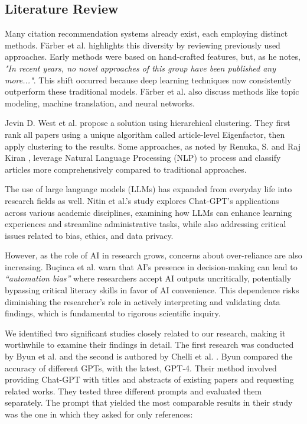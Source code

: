 \documentclass[runningheads]{llncs}
\begin{document}

\subsection{Literature Review}\label{literature}

Many citation recommendation systems already exist, each employing distinct methods. Färber et al. \cite{farber_2020} highlights this diversity by reviewing previously used approaches. Early methods were based on hand-crafted features, but, as he notes, \textit{"In recent years, no novel approaches of this group have been published any more..."}. This shift occurred because deep learning techniques now consistently outperform these traditional models. Färber et al. also discuss methods like topic modeling, machine translation, and neural networks.

Jevin D. West et al. \cite{jevin_2016} propose a solution using hierarchical clustering. They first rank all papers using a unique algorithm called article-level Eigenfactor, then apply clustering to the results. Some approaches, as noted by Renuka, S. and Raj Kiran \cite{Renuka_2021}, leverage Natural Language Processing (NLP) to process and classify articles more comprehensively compared to traditional approaches.

The use of large language models (LLMs) has expanded from everyday life into research fields as well. Nitin et al.'s study \cite{Rane_2023} explores Chat-GPT's applications across various academic disciplines, examining how LLMs can enhance learning experiences and streamline administrative tasks, while also addressing critical issues related to bias, ethics, and data privacy.

However, as the role of AI in research grows, concerns about over-reliance are also increasing. Buçinca et al. \cite{buccinca_2021} warn that AI's presence in decision-making can lead to \textit{“automation bias”} where researchers accept AI outputs uncritically, potentially bypassing critical literacy skills in favor of AI convenience. This dependence risks diminishing the researcher's role in actively interpreting and validating data findings, which is fundamental to rigorous scientific inquiry. 

We identified two significant studies closely related to our research, making it worthwhile to examine their findings in detail. The first research was conducted by Byun et al. \cite{byun-etal-2024-reference} and the second is authored by Chelli et al. \cite{Chelli_2024}. Byun compared the accuracy of different GPTs, with the latest, GPT-4. Their method involved providing Chat-GPT with titles and abstracts of existing papers and requesting related works. They tested three different prompts and evaluated them separately. The prompt that yielded the most comparable results in their study was the one in which they asked for only references:
\end{document}

